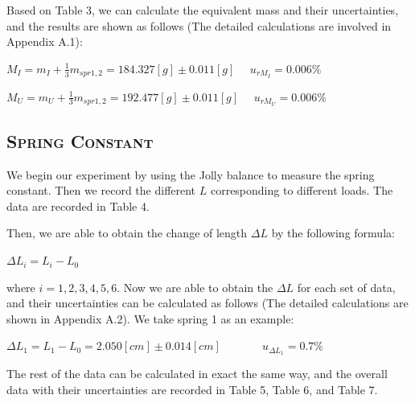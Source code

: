 \documentclass[a4paper,12pt]{article}
\begin{document}
\newpage
Based on Table 3, we can calculate the equivalent mass and their uncertainties, and the results are shown as follows (The detailed calculations are involved in Appendix A.1):
      \begin{center}
      $ \displaystyle M_I = m_I + \frac{1}{3}m_{spr1,2} = 184.327 [g] \pm 0.011 [g] ~~~~~~ u_{rM_I} = 0.006\%$
      \end{center}
      \begin{center}
      $ \displaystyle M_U = m_U + \frac{1}{3}m_{spr1,2} = 192.477 [g] \pm 0.011 [g] ~~~~~~ u_{rM_U} = 0.006\%$
      \end{center}
      
      
\subsection{\textsc{Spring Constant}}
We begin our experiment by using the Jolly balance to measure the spring constant. Then we record the different $L$ corresponding to different loads. The data are recorded in Table 4.

\begin{table}[h]
\begin{center}
\end{center}
\caption{Measurement for single constant.}
\end{table}

\par Then, we are able to obtain the change of length $\Delta L$ by the following formula:
\begin{center}
$ \Delta L_i = L_i - L_0 $
\end{center}
where $i = 1,2,3,4,5,6$. Now we are able to obtain the $\Delta L$ for each set of data, and their uncertainties can be calculated as follows (The detailed calculations are shown in Appendix A.2). We take spring 1 as an example:
\begin{center}
$ \Delta L_1 = L_1 - L_0 = 2.050 [cm] \pm  0.014 [cm]$ ~~~~~~ $ u_{\Delta L_1} = 0.7 \% $
\end{center}
The rest of the data can be calculated in exact the same way, and the overall data with their uncertainties are recorded in Table 5, Table 6, and Table 7.
\end{document}
